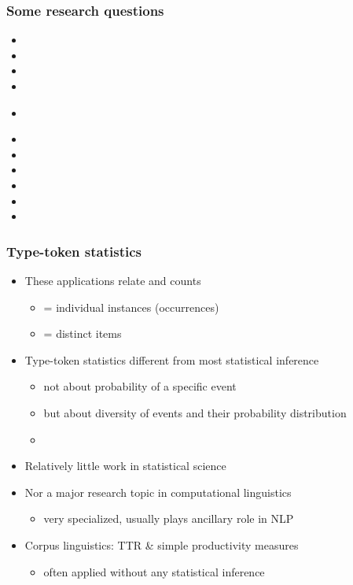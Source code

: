 \documentclass[t]{beamer} %
\begin{document}
\begin{frame}
  \frametitle{Some research questions}

  \begin{itemize}
  \item {}
  \item {}
  \item {}
  \item {}
  \item {}\\\rule{0mm}{1ex}
  \item {}
  \item {}
  \item {}
  \item {}
  \item {}
  \item {}
  \end{itemize}
\end{frame}

\begin{frame}
  \frametitle{Type-token statistics}

  \begin{itemize}
  \item These applications relate  and  counts
    \begin{itemize}
    \item {} = individual instances (occurrences)
    \item {} = distinct items
    \end{itemize}
  \item Type-token statistics different from most statistical inference
    \begin{itemize}
    \item not about probability of a specific event
    \item but about diversity of events and their probability distribution
    \item[]\pause
    \end{itemize}
  \item Relatively little work in statistical science
  \item Nor a major research topic in computational linguistics
    \begin{itemize}
    \item very specialized, usually plays ancillary role in NLP
    \end{itemize}
  \item Corpus linguistics: TTR \& simple productivity measures
    \begin{itemize}
    \item often applied without any statistical inference
    \end{itemize}
  \end{itemize}
\end{frame}
\end{document}

